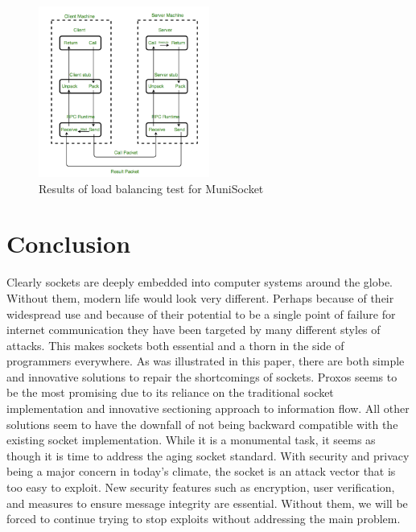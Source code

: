 \documentclass[conference, 12pt]{IEEEtran}
\begin{document}
\begin{figure}[H]
    \centering
    \centerline{\includegraphics[width=0.5\textwidth]{Figure8.png}}
    \caption{Results of load balancing test for MuniSocket \cite{geeks}}
    \label{Figure8}
\end{figure}

\section{Conclusion}
Clearly sockets are deeply embedded into computer systems around the globe. Without them, modern life would look very different. Perhaps because of their widespread use and because of their potential to be a single point of failure for internet communication they have been targeted by many different styles of attacks. This makes sockets both essential and a thorn in the side of programmers everywhere. As was illustrated in this paper, there are both simple and innovative solutions to repair the shortcomings of sockets. Proxos seems to be the most promising due to its reliance on the traditional socket implementation and innovative sectioning approach to information flow. All other solutions seem to have the downfall of not being backward compatible with the existing socket implementation. While it is a monumental task, it seems as though it is time to address the aging socket standard. With security and privacy being a major concern in today’s climate, the socket is an attack vector that is too easy to exploit. New security features such as encryption, user verification, and measures to ensure message integrity are essential. Without them, we will be forced to continue trying to stop exploits without addressing the main problem.



\end{document}
